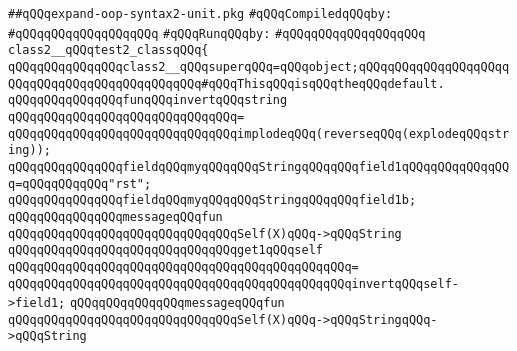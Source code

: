 \label{src/lib/compiler/front/typer/main/expand-oop-syntax2-unit-test.pkg}
\verb|##qQQqexpand-oop-syntax2-unit.pkg|\newline
\newline
\verb|#qQQqCompiledqQQqby:|\newline
\verb|#qQQqqQQqqQQqqQQqqQQq|\newline
\newline
\verb|#qQQqRunqQQqby:|\newline
\verb|#qQQqqQQqqQQqqQQqqQQq|\newline
\newline
\newline
\newline
\verb|class2__qQQqtest2_classqQQq{|\newline
\newline
\verb|qQQqqQQqqQQqqQQqclass2__qQQqsuperqQQq=qQQqobject;qQQqqQQqqQQqqQQqqQQqqQQqqQQqqQQqqQQqqQQqqQQqqQQq#qQQqThisqQQqisqQQqtheqQQqdefault.|\newline
\newline
\verb|qQQqqQQqqQQqqQQqfunqQQqinvertqQQqstring|\newline
\verb|qQQqqQQqqQQqqQQqqQQqqQQqqQQqqQQq=|\newline
\verb|qQQqqQQqqQQqqQQqqQQqqQQqqQQqqQQqimplodeqQQq(reverseqQQq(explodeqQQqstring));|\newline
\newline
\verb|qQQqqQQqqQQqqQQqfieldqQQqmyqQQqqQQqStringqQQqqQQqfield1qQQqqQQqqQQqqQQq=qQQqqQQqqQQq"rst";|\newline
\verb|qQQqqQQqqQQqqQQqfieldqQQqmyqQQqqQQqStringqQQqqQQqfield1b;|\newline
\newline
\verb|qQQqqQQqqQQqqQQqmessageqQQqfun|\newline
\verb|qQQqqQQqqQQqqQQqqQQqqQQqqQQqqQQqSelf(X)qQQq->qQQqString|\newline
\verb|qQQqqQQqqQQqqQQqqQQqqQQqqQQqqQQqget1qQQqself|\newline
\verb|qQQqqQQqqQQqqQQqqQQqqQQqqQQqqQQqqQQqqQQqqQQqqQQq=|\newline
\verb|qQQqqQQqqQQqqQQqqQQqqQQqqQQqqQQqqQQqqQQqqQQqqQQqinvertqQQqself->field1;|\newline
\newline
\verb|qQQqqQQqqQQqqQQqmessageqQQqfun|\newline
\verb|qQQqqQQqqQQqqQQqqQQqqQQqqQQqqQQqSelf(X)qQQq->qQQqStringqQQq->qQQqString|\newline
